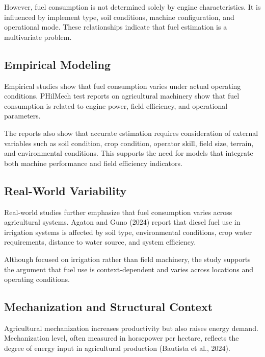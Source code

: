 \documentclass[11pt,twocolumn]{article}
\begin{document}
\vspace{10pt}

However, fuel consumption is not determined solely by engine characteristics. It is influenced by implement type, soil conditions, machine configuration, and operational mode. These relationships indicate that fuel estimation is a multivariate problem.

\subsection*{Empirical Modeling}

Empirical studies show that fuel consumption varies under actual operating conditions. PHilMech test reports on agricultural machinery show that fuel consumption is related to engine power, field efficiency, and operational parameters.

\vspace{10pt}

The reports also show that accurate estimation requires consideration of external variables such as soil condition, crop condition, operator skill, field size, terrain, and environmental conditions. This supports the need for models that integrate both machine performance and field efficiency indicators.

\subsection*{Real-World Variability}

Real-world studies further emphasize that fuel consumption varies across agricultural systems. Agaton and Guno (2024) report that diesel fuel use in irrigation systems is affected by soil type, environmental conditions, crop water requirements, distance to water source, and system efficiency.

\vspace{10pt}

Although focused on irrigation rather than field machinery, the study supports the argument that fuel use is context-dependent and varies across locations and operating conditions.

\subsection*{Mechanization and Structural Context}

Agricultural mechanization increases productivity but also raises energy demand. Mechanization level, often measured in horsepower per hectare, reflects the degree of energy input in agricultural production (Bautista et al., 2024).
\end{document}
